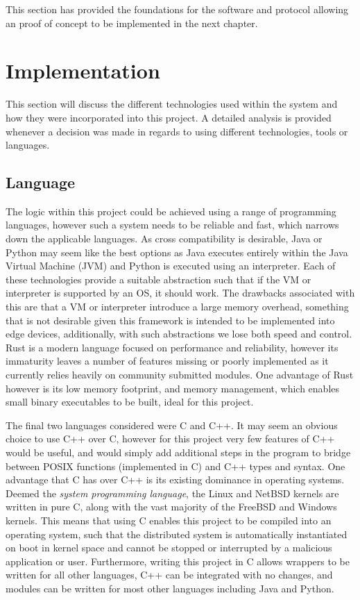 \documentclass[a4paper, 11pt]{report}
\begin{document}
This section has provided the foundations for the software and protocol allowing an proof of concept to be implemented in the next chapter.

\chapter{Implementation}

This section will discuss the different technologies used within the system and how they were incorporated into this project. A detailed analysis is provided whenever a decision was made in regards to using different technologies, tools or languages. 

\section{Language}
The logic within this project could be achieved using a range of programming languages, however such a system needs to be reliable and fast, which narrows down the applicable languages. As cross compatibility is desirable, Java\cite{java} or Python\cite{python} may seem like the best options as Java executes entirely within the Java Virtual Machine (JVM)\cite{jvm} and Python is executed using an interpreter. Each of these technologies provide a suitable abstraction such that if the \acrshort{VM} or interpreter is supported by an \acrshort{OS}, it should work. The drawbacks associated with this are that a \acrshort{VM} or interpreter introduce a large memory overhead, something that is not desirable given this framework is intended to be implemented into edge devices, additionally, with such abstractions we lose both speed and control. Rust\cite{rust} is a modern language focused on performance and reliability, however its immaturity leaves a number of features missing or poorly implemented as it currently relies heavily on community submitted modules. One advantage of Rust however is its low memory footprint, and memory management, which enables small binary executables to be built, ideal for this project. 

The final two languages considered were C\cite{c} and C++\cite{cpp}. It may seem an obvious choice to use C++ over C, however for this project very few features of C++ would be useful, and would simply add additional steps in the program to bridge between \acrfull{POSIX} functions (implemented in C) and C++ types and syntax. One advantage that C has over C++ is its existing dominance in operating systems. Deemed the \textit{system programming language}, the Linux\cite{linux} and NetBSD\cite{netbsd} kernels are written in pure C, along with the vast majority of the FreeBSD\cite{freebsd} and Windows\cite{windows} kernels. This means that using C enables this project to be compiled into an operating system, such that the distributed system is automatically instantiated on boot in kernel space and cannot be stopped or interrupted by a malicious application or user. Furthermore, writing this project in C allows wrappers to be written for all other languages, C++ can be integrated with no changes, and modules can be written for most other languages including Java and Python.
\end{document}
